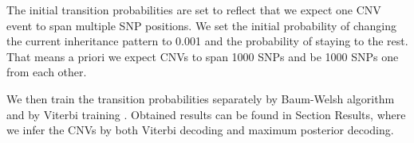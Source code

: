 The initial transition probabilities are set to reflect that we expect one CNV event to span multiple SNP positions. We set the initial probability of changing the current inheritance pattern to 0.001 and the probability of staying to the rest. That means a priori we expect CNVs to span 1000 SNPs and be 1000 SNPs one from each other.

We then train the transition probabilities separately by Baum-Welsh algorithm and by Viterbi training \cite{durbin1998}. Obtained results can be found in Section Results, where we infer the CNVs by both Viterbi decoding and maximum posterior decoding.